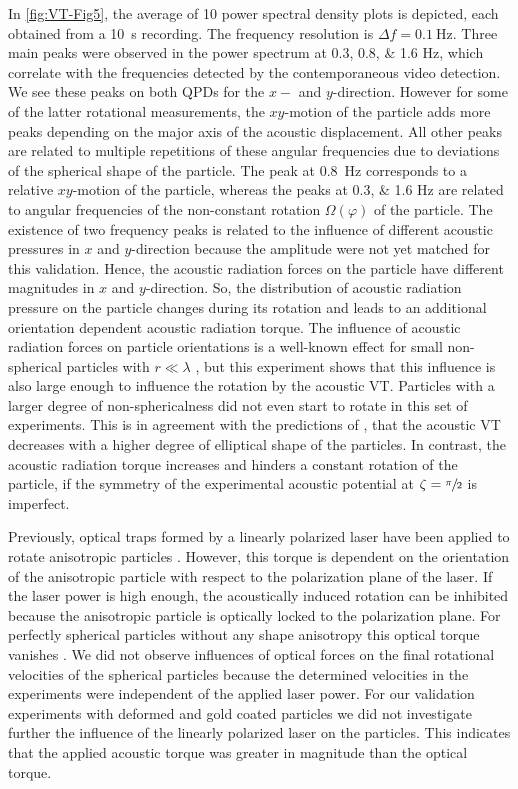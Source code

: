 In \cref{fig:VT-Fig5}, the average of 10 power spectral density plots is depicted, 
each obtained from a \SI{10}{\second} recording. The frequency resolution is 
$\Delta f=\SI{0.1}{\hertz}$. Three main peaks were observed in the power 
spectrum at \numlist{0.3; 0.8; 1.6} \si{\hertz}, which correlate with the 
frequencies detected by the contemporaneous video detection. We see these peaks 
on both QPDs for the $x-$ and $y$-direction. However for some of the latter 
rotational measurements, the $xy$-motion of the particle adds more peaks 
depending on the major axis of the acoustic displacement. All other peaks are 
related to multiple repetitions of these angular frequencies due to deviations 
of the spherical shape of the particle.  The peak at \SI{0.8}{\hertz} 
corresponds to a relative $xy$-motion of the particle, whereas the peaks at 
\numlist{0.3; 1.6} \si{\hertz} are related to angular frequencies of the 
non-constant rotation $\Omega(\varphi)$ of the particle. The existence of two 
frequency peaks is related to the influence of different acoustic pressures in 
$x$ and $y$-direction because the amplitude were not yet matched for this 
validation.  Hence, the acoustic radiation forces on the particle have different 
magnitudes in $x$ and $y$-direction. So, the distribution of acoustic radiation 
pressure on the particle changes during its rotation and leads to an additional 
orientation dependent acoustic radiation torque.  The influence of acoustic 
radiation forces on particle orientations is a well-known effect for small 
non-spherical particles with $r \ll \lambda$ \cite{Konig1891,Garbin2015}, but 
this experiment shows that this influence is also large enough to influence the 
rotation by the acoustic VT.  Particles with a larger degree of 
non-sphericalness did not even start to rotate in this set of experiments. This 
is in agreement with the predictions of \citeauthor{Hahn2016} \cite{Hahn2016}, 
that the acoustic VT decreases with a higher degree of elliptical shape of the 
particles. In contrast, the acoustic radiation torque increases and hinders a 
constant rotation of the particle, if the symmetry of the experimental acoustic 
potential at $\zeta= \sfrac{\pi}{2}$ is imperfect.

Previously, optical traps formed by a linearly polarized laser have been applied 
to rotate anisotropic particles \cite{GutirezMedina2010}. However, this torque 
is dependent on the orientation of the anisotropic particle with respect to the 
polarization plane of the laser. If the laser power is high enough, the 
acoustically induced rotation can be inhibited because the anisotropic particle 
is optically locked to the polarization plane. For perfectly spherical particles 
without any shape anisotropy this optical torque vanishes 
\cite{Manzo2006,Friese1998}. We did not observe influences of optical forces on 
the final rotational velocities of the spherical particles because the 
determined velocities in the experiments were independent of the applied laser 
power. For our validation experiments with deformed and gold coated particles we 
did not investigate further the influence of the linearly polarized laser on the 
particles. This indicates that the applied acoustic torque was greater in 
magnitude than the optical torque.


